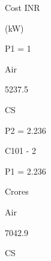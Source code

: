\documentclass[a4paper,portrait,12pt]{article}
\begin{document}
\begin{flushleft}
Cost INR
\end{flushleft}





\begin{flushleft}
(kW)
\end{flushleft}


\begin{flushleft}
P1 = 1
\end{flushleft}





\begin{flushleft}
Air
\end{flushleft}





5237.5





\begin{flushleft}
CS
\end{flushleft}





\begin{flushleft}
P2 = 2.236
\end{flushleft}


\begin{flushleft}
C101 - 2
\end{flushleft}





\begin{flushleft}
P1 = 2.236
\end{flushleft}





\begin{flushleft}
Crores
\end{flushleft}


\begin{flushleft}
Air
\end{flushleft}





7042.9





\begin{flushleft}
CS
\end{flushleft}
\end{document}
